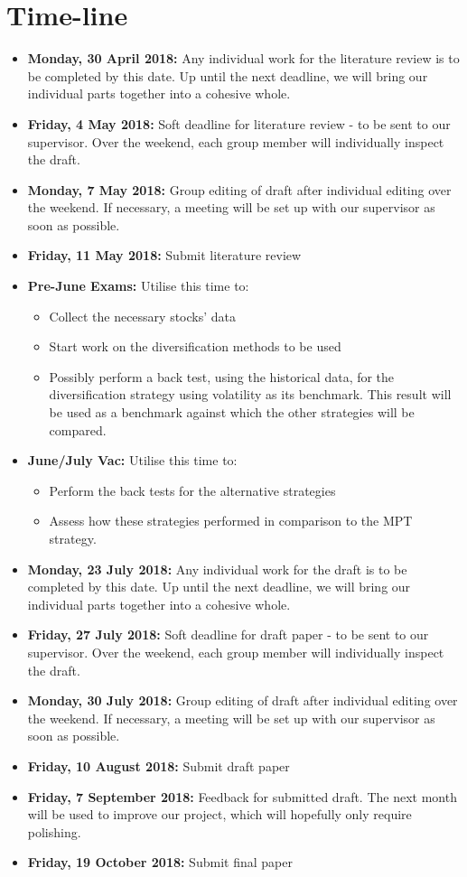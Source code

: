 \documentclass[12pt,a4paper]{article}
\newcommand{\bi}{\begin{itemize}}
\newcommand{\ei}{\end{itemize}}
\begin{document}
\section{Time-line}
\label{sec:time}

\bi
\item \textbf{Monday, 30 April 2018:} Any individual work for the literature review is to be completed by this date. Up until the next deadline, we will bring our individual parts together into a cohesive whole.
\item \textbf{Friday, 4 May 2018:} Soft deadline for literature review - to be sent to our supervisor. Over the weekend, each group member will individually inspect the draft.
\item \textbf{Monday, 7 May 2018:} Group editing of draft after individual editing over the weekend. If necessary, a meeting will be set up with our supervisor as soon as possible.
\item \textbf{Friday, 11 May 2018:} Submit literature review
\item \textbf{Pre-June Exams:} Utilise this time to:
	\bi
	\item Collect the necessary stocks' data
	\item Start work on the diversification methods to be used
	\item Possibly perform a back test, using the historical data, for the diversification strategy using volatility as its benchmark. This result will be used as a benchmark against which the other strategies will be compared. 
	\ei
\item \textbf{June/July Vac:} Utilise this time to:
	\bi
	\item Perform the back tests for the alternative strategies
	\item Assess how these strategies performed in comparison to the MPT strategy.
	\ei
\item \textbf{Monday, 23 July 2018:} Any individual work for the draft is to be completed by this date. Up until the next deadline, we will bring our individual parts together into a cohesive whole.
\item \textbf{Friday, 27 July 2018:} Soft deadline for draft paper - to be sent to our supervisor. Over the weekend, each group member will individually inspect the draft.
\item \textbf{Monday, 30 July 2018:} Group editing of draft after individual editing over the weekend. If necessary, a meeting will be set up with our supervisor as soon as possible.
\item \textbf{Friday, 10 August 2018:} Submit draft paper 
\item \textbf{Friday, 7 September 2018:} Feedback for submitted draft. The next month will be used to improve our project, which will hopefully only require polishing.
\item \textbf{Friday, 19 October 2018:} Submit final paper 
\ei

\newpage


\label{bib:bibliography}
 
\end{document}
